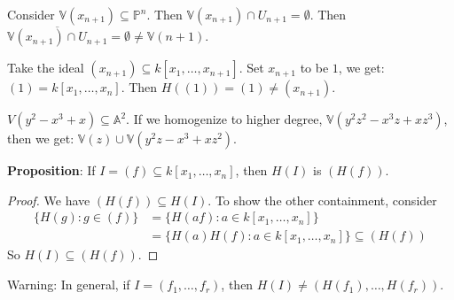 \documentclass{report}
\begin{document}
\begin{examples}
    \begin{example}
        Consider $\mathbb{V}(x_{n + 1}) \subseteq \mathbb{P}^{n}$. Then $\mathbb{V}(x_{n + 1}) \cap U_{n + 1} = \emptyset$. Then $\overline{\mathbb{V}(x_{n + 1}) \cap U_{n + 1}} = \emptyset \neq \mathbb{V}(n + 1)$.
    \end{example}
    \begin{example}
        Take the ideal $(x_{n + 1}) \subseteq k[x_{1}, \ldots, x_{n + 1}]$. Set $x_{n + 1}$ to be $1$, we get: $(1) = k[x_{1}, \ldots, x_{n}]$. Then $H((1)) = (1) \neq (x_{n + 1})$.
    \end{example}
    \begin{example}
        $V(y^{2} - x^{3} + x) \subseteq \mathbb{A}^{2}$. If we homogenize to higher degree, $\mathbb{V}(y^{2}z^{2} - x^{3}z + xz^{3})$, then we get: $\mathbb{V}(z) \cup \mathbb{V}(y^{2}z - x^{3} + xz^{2})$. 
    \end{example}
\end{examples}

\textbf{Proposition}: If $I = (f) \subseteq k[x_{1}, \ldots, x_{n}]$, then $H(I)$ is $(H(f))$.
    \begin{proof}
        We have $(H(f)) \subseteq H(I)$. To show the other containment, consider
            \begin{align*}
                \{H(g) : g \in (f)\} &= \{H(af) : a \in k[x_{1}, \ldots, x_{n}]\} \\
                                     &= \{H(a) H(f) : a \in k[x_{1}, \ldots, x_{n}]\} \subseteq (H(f))
            \end{align*}
        So $H(I) \subseteq (H(f))$.
    \end{proof}

Warning: In general, if $I = (f_{1}, \ldots, f_{r})$, then $H(I) \neq (H(f_{1}), \ldots, H(f_{r}))$.
\end{document}
